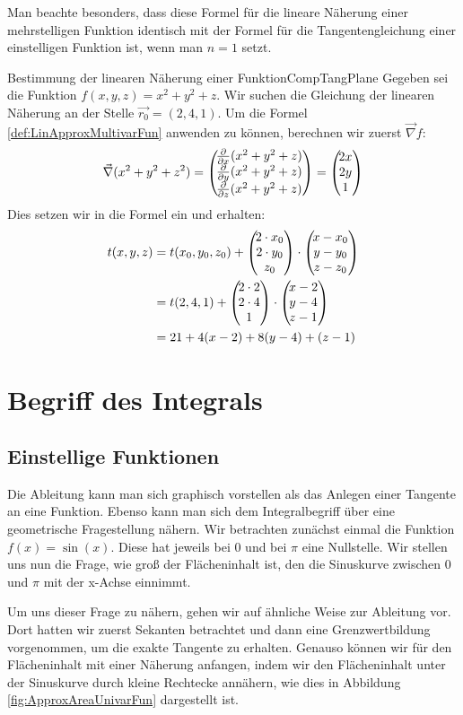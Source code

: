 Man beachte besonders, dass diese Formel für die lineare Näherung einer mehrstelligen Funktion identisch mit der Formel für die Tangentengleichung einer einstelligen Funktion ist, wenn man $n=1$ setzt.

\begin{example}{Bestimmung der linearen Näherung einer Funktion}{CompTangPlane}
    Gegeben sei die Funktion $f(x,y,z) =x^2+y^2+z$. Wir suchen die Gleichung der linearen Näherung an der Stelle $\vec{r_0} = (2,4,1)$. Um die Formel \ref{def:LinApproxMultivarFun} anwenden zu können, berechnen wir zuerst $\vec\nabla f$:
    $$
        \vec\nabla (x^2+y^2+z^2) = \left(\negthinspace\begin{matrix}\frac{\partial }{\partial x} (x^2+y^2+z)\\\frac{\partial }{\partial y} (x^2+y^2+z)\\\frac{\partial }{\partial z} (x^2+y^2+z)\end{matrix}\right) = \left(\negthinspace\begin{matrix}2x\\2y\\1\end{matrix}\right)
    $$
    Dies setzen wir in die Formel ein und erhalten:
    \begin{alignat*}{1}
        t(x,y,z) &= t(x_0,y_0,z_0) + \left(\negthinspace\begin{matrix}2\cdot x_0\\2\cdot y_0\\z_0\end{matrix}\right) \cdot \left(\negthinspace\begin{matrix}x-x_0\\y-y_0\\z-z_0\end{matrix}\right) \\
                 &= t(2,4,1) + \left(\negthinspace\begin{matrix}2\cdot 2\\2\cdot 4\\1\end{matrix}\right) \cdot \left(\negthinspace\begin{matrix}x-2\\y-4\\z-1\end{matrix}\right) \\
                 &= 21 + 4 (x-2) + 8 (y-4) + (z-1)
    \end{alignat*}
\end{example}


\section{Begriff des Integrals}

\subsection{Einstellige Funktionen}

Die Ableitung kann man sich graphisch vorstellen als das Anlegen einer Tangente an eine Funktion. Ebenso kann man sich dem Integralbegriff über eine geometrische Fragestellung nähern. Wir betrachten zunächst einmal die Funktion $f(x) = \sin(x)$. Diese hat jeweils bei $0$ und bei $\pi$ eine Nullstelle. Wir stellen uns nun die Frage, wie groß der Flächeninhalt ist, den die Sinuskurve zwischen $0$ und $\pi$ mit der x-Achse einnimmt.

Um uns dieser Frage zu nähern, gehen wir auf ähnliche Weise zur Ableitung vor. Dort hatten wir zuerst Sekanten betrachtet und dann eine Grenzwertbildung vorgenommen, um die exakte Tangente zu erhalten. Genauso können wir für den Flächeninhalt mit einer Näherung anfangen, indem wir den Flächeninhalt unter der Sinuskurve durch kleine Rechtecke annähern, wie dies in Abbildung \ref{fig:ApproxAreaUnivarFun} dargestellt ist.

